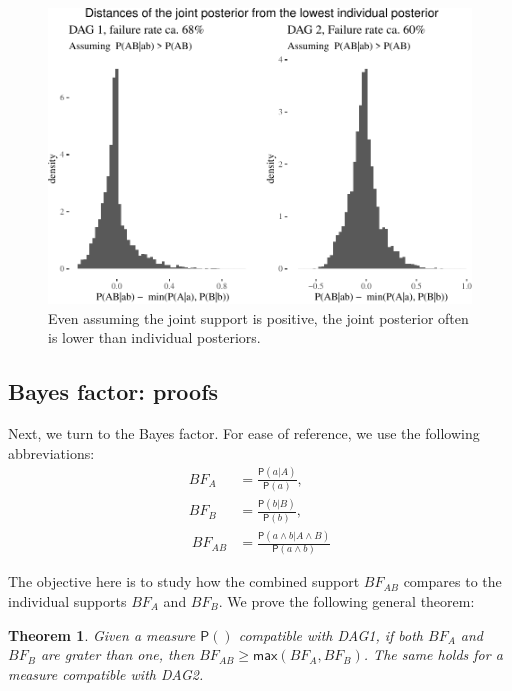 \documentclass[
  10pt,
  dvipsnames,enabledeprecatedfontcommands]{scrartcl}
\newcommand{\pr}[1]{\ensuremath{\mathsf{P}(#1)}}
\newtheorem{theorem}{Theorem}
\begin{document}
\begin{figure}[H]


\begin{center}\includegraphics[width=0.75\linewidth]{conjunction-appendix14_files/figure-latex/unnamed-chunk-11-1} \end{center}
\caption{Even assuming the joint support is positive, the joint posterior often is lower than individual posteriors.}
\label{fig:posteriorFailure}
\end{figure}

\hypertarget{bayes-factor-proofs}{%
\subsection*{Bayes factor: proofs}\label{bayes-factor-proofs}}

Next, we turn to the Bayes factor. For ease of reference, we use the
following abbreviations: \begin{align*}
BF_A  & =  \frac{\pr{a \vert A}}{\pr{a}},\\
BF_B & = \frac{\pr{b \vert B}}{\pr{b}},\\\
BF_{AB}  & =  \frac{\pr{a\wedge b \vert A \wedge B}}{\pr{a \wedge b}}
\end{align*}

\noindent The objective here is to study how the combined support
\(BF_{AB}\) compares to the individual supports \(BF_A\) and \(BF_B\).
We prove the following general theorem:

\begin{theorem}
Given a measure $\pr{}$ compatible with \textsf{DAG1}, if both $BF_A$ and $BF_B$ 
are grater than one, then $BF_{AB}\geq \mathsf{max}(BF_{A},BF_{B})$.
The same holds for a measure compatible with \textsf{DAG2}.
\label{thm:aggregationBf}
\end{theorem}
\end{document}
